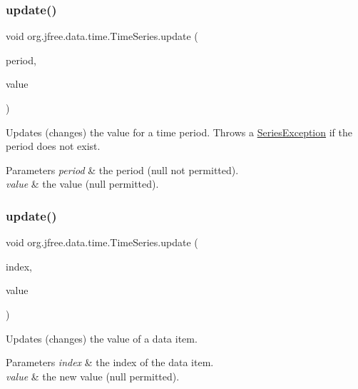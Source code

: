 \subsubsection{\texorpdfstring{update()}{update()}\hspace{0.1cm}{\footnotesize\ttfamily [2/3]}}
{\footnotesize\ttfamily void org.\+jfree.\+data.\+time.\+Time\+Series.\+update (\begin{DoxyParamCaption}\item[{\mbox{\hyperlink{classorg_1_1jfree_1_1data_1_1time_1_1_regular_time_period}{Regular\+Time\+Period}}}]{period,  }\item[{Number}]{value }\end{DoxyParamCaption})}

Updates (changes) the value for a time period. Throws a \mbox{\hyperlink{}{Series\+Exception}} if the period does not exist.


\begin{DoxyParams}{Parameters}
{\em period} & the period ({\ttfamily null} not permitted). \\
\hline
{\em value} & the value ({\ttfamily null} permitted). \\
\hline
\end{DoxyParams}
\mbox{\label{classorg_1_1jfree_1_1data_1_1time_1_1_time_series_a29b4b497af7a65eab2b191facbe0fde9}} 
\subsubsection{\texorpdfstring{update()}{update()}\hspace{0.1cm}{\footnotesize\ttfamily [3/3]}}
{\footnotesize\ttfamily void org.\+jfree.\+data.\+time.\+Time\+Series.\+update (\begin{DoxyParamCaption}\item[{int}]{index,  }\item[{Number}]{value }\end{DoxyParamCaption})}

Updates (changes) the value of a data item.


\begin{DoxyParams}{Parameters}
{\em index} & the index of the data item. \\
\hline
{\em value} & the new value ({\ttfamily null} permitted). \\
\hline
\end{DoxyParams}


